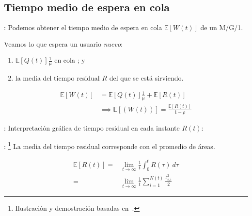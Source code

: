 \documentclass[xcolor={x11names}]{beamer}
\begin{document}
\subsection{Tiempo medio de espera en cola}
\begin{frame}{\secname: \subsecname}
    Podemos obtener el tiempo medio
    de espera en cola $\mathbb{E}[W(t)]$ de
    un M/G/1.
    \begin{figure}
        
    \end{figure}
    Veamos lo que espera un usuario
    \emph{nuevo}:
    \begin{enumerate}
        \item $\mathbb{E}[Q(t)]\tfrac{1}{\mu}$
            en cola ; y
        \item la media del tiempo residual
            $R$ del que
            se está sirviendo.
    \end{enumerate}
    \begin{align*}
        \mathbb{E}[W(t)]&=
        \mathbb{E}[Q(t)]\tfrac{1}{\mu}
        + \mathbb{E}[R(t)]\\
        &\implies \mathbb{E}[(W(t))]=
        \frac{\mathbb{E}[R(t)]}{1-\rho}
    \end{align*}
\end{frame}




\begin{frame}{\secname: \subsecname}
    Interpretación gráfica de tiempo
    residual en cada instante $R(t)$:
    \begin{figure}
        
    \end{figure}
\end{frame}



\begin{frame}{\secname: \subsecname}
    \footnote{
    Ilustración y demostración basadas
    en~\cite[Figura 8.3]{amable}.}
    La media del tiempo residual corresponde
    con el promedio de áreas.
    \begin{figure}
        
    \end{figure}
    \begin{align*}
        \mathbb{E}[R(t)]=&\lim_{t\to\infty}
        \frac{1}{t}\int_0^t
        R(\tau)\ d\tau\\
        =& \lim_{t\to\infty} \frac{1}{t}
        \sum_{i=1}^{N(t)} \frac{t_{s,i}^2}{2}
    \end{align*}
\end{frame}
\end{document}

